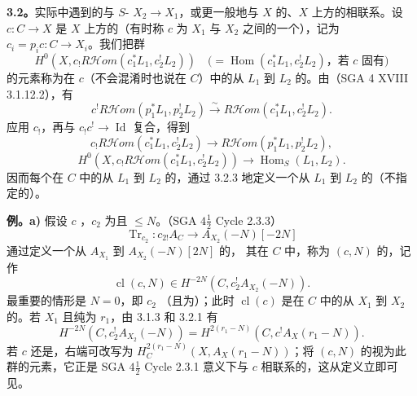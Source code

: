 \textbf{3.2。}实际中遇到的与 $S$- $X_2\to X_1$，或更一般地与 $X$ 的、$X$ 上方的相联系。设 $c:C\to X$ 是 $X$ 上方的（有时称 $c$ 为 $X_1$ 与 $X_2$ 之间的一个），记为 $c_i=p_ic:C\to X_i$。我们把群
\[
H^0(X,c_!R\mathcal Hom(c_1^*L_1,c_2^!L_2))
\quad\bigl(=\operatorname{Hom}(c_1^*L_1,c_2^!L_2)\text{，若 }c\text{ 固有}\bigr)
\]
的元素称为在 $c$（不会混淆时也说在 $C$）中的从 $L_1$ 到 $L_2$ 的。由（SGA 4 XVIII 3.1.12.2），有
\[
c^!R\mathcal Hom(p_1^*L_1,p_2^!L_2)\xrightarrow\sim R\mathcal Hom(c_1^*L_1,c_2^!L_2).\tag{3.2.1}
\]
应用 $c_!$，再与 $c_!c^!\to\operatorname{Id}$ 复合，得到
\[
c_!R\mathcal Hom(c_1^*L_1,c_2^!L_2)\longrightarrow R\mathcal Hom(p_1^*L_1,p_2^!L_2),\tag{3.2.2}
\]
\[
H^0(X,c_!R\mathcal Hom(c_1^*L_1,c_2^!L_2))\longrightarrow\operatorname{Hom}_S(L_1,L_2).\tag{3.2.3}
\]
因而每个在 $C$ 中的从 $L_1$ 到 $L_2$ 的，通过 3.2.3 地定义一个从 $L_1$ 到 $L_2$ 的（不指定的）。

\textbf{例。a)} 假设 $c$ ，$c_2$ 为且 $\le N$。（SGA $4\frac12$ Cycle 2.3.3）
\[
\operatorname{Tr}_{c_2}:c_{2!}A_C\longrightarrow A_{X_2}(-N)[-2N]
\]
通过定义一个从 $A_{X_1}$ 到 $A_{X_2}(-N)[2N]$ 的，
其在 $C$ 中，称为 $(c,N)$ 的，记作
\[
\operatorname{cl}(c,N)\in H^{-2N}(C,c_2^!A_{X_2}(-N)).\tag{3.2.4}
\]
最重要的情形是 $N=0$，即 $c_2$ （且为）；此时 $\operatorname{cl}(c)$ 是在 $C$ 中的从 $X_1$ 到 $X_2$ 的。若 $X_1$ 且纯为 $r_1$，由 3.1.3 和 3.2.1 有
\[
H^{-2N}(C,c_2^!A_{X_2}(-N))=H^{2(r_1-N)}(C,c^!A_X(r_1-N)).\tag{3.2.5}
\]
若 $c$ 还是，右端可改写为 $H_C^{2(r_1-N)}(X,A_X(r_1-N))$；将 $(c,N)$ 的视为此群的元素，它正是 SGA $4\frac12$ Cycle 2.3.1 意义下与 $c$ 相联系的，这从定义立即可见。

